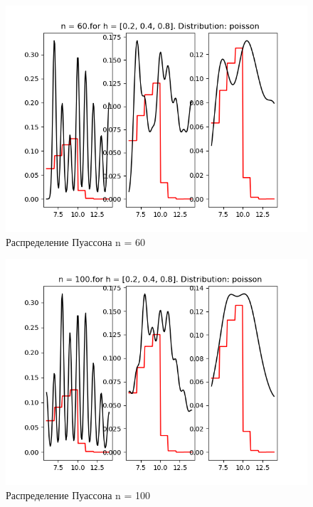 \documentclass[a4]{article}
\begin{document}
\begin{center}
\begin{figure}[h!]
				\includegraphics[width=\textwidth]{poissonker60.png}
				\caption[Распределение Пуассона n = 60]{Распределение Пуассона n = 60}
			\end{figure}
			\newpage
			\begin{figure}[h!]
				\includegraphics[width=\textwidth]{poissonker100.png}
				\caption[Распределение Пуассона n = 100]{Распределение Пуассона n = 100}
			\end{figure}
			\newpage
			\begin{figure}[h!]

\end{figure}
\end{center}
\end{document}
